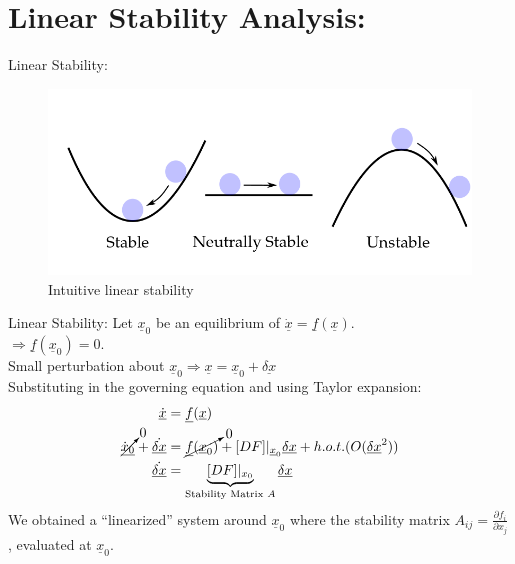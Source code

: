 \documentclass{beamer}
\begin{document}
\section{Linear Stability Analysis:}
\begin{frame}{Linear Stability:}
\begin{figure}[ht]
  \centering
  \includegraphics[scale=0.3]
  {Figs/stability_drawing.png}  
  \caption{Intuitive linear stability}
  \label{fig:stability_drawing}
\end{figure}
\end{frame}
\begin{frame}{Linear Stability:}
 Let $\underline{x}_{0}$ be an equilibrium of $\underline{\dot{x}} = \underline{f}(\underline{x})$.\\
 $\Rightarrow \underline{f}(\underline{x}_{0}) = 0$.\\
 Small perturbation about $\underline{x}_{0} \Rightarrow \underline{x} = \underline{x}_{0} + \underline{\delta x}$\\
 Substituting in the governing equation and using Taylor expansion:\\
 \begin{align*}
  \underline{\dot{x}} &= \underline{f}(\underline{x})\\
  \cancelto{0}{\underline{\dot{x}_{0}}} + \underline{\dot{\delta x}} &= \cancelto{0}{\underline{f}(\underline{x}_{0})} + [DF]|_{\underline{x}_{0}} \underline{\delta x} + h.o.t. (O(\underline{\delta x}^{2}))\\
  \underline{\dot{\delta x}} &= \underbrace{[DF]|_{x_{0}}}_{\text{Stability Matrix } A} \underline{\delta x}
 \end{align*}
 We obtained a ``linearized'' system around $\underline{x}_{0}$
 where the stability matrix $A_{ij} = \frac{\partial f_{i}}{\partial x_{j}}$, evaluated at $\underline{x}_{0}$.
\end{frame}
\end{document}
